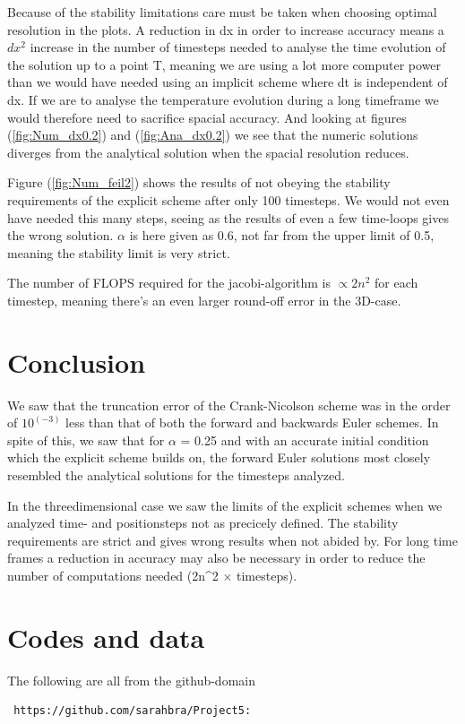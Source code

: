 \documentclass[a4paper,10pt]{article}
\begin{document}
Because of the stability limitations care must be taken when choosing optimal resolution in the plots. A reduction in dx in order to increase accuracy means a $dx^2$ increase in the number of timesteps needed to analyse the time evolution of the solution up to a point T, meaning we are using a lot more computer power than we would have needed using an implicit scheme where dt is independent of dx.
If we are to analyse the temperature evolution during a long timeframe we would therefore need to sacrifice spacial accuracy. And looking at figures (\ref{fig:Num_dx0.2}) and (\ref{fig:Ana_dx0.2}) we see that the numeric solutions diverges from the analytical solution when the spacial resolution reduces.

Figure (\ref{fig:Num_feil2}) shows the results of not obeying the stability requirements of the explicit scheme after only 100 timesteps. We would not even have needed this many steps, seeing as the results of even a few time-loops gives the wrong solution. $\alpha$ is here given as 0.6, not far from the upper limit of 0.5, meaning the stability limit is very strict.

The number of FLOPS required for the jacobi-algorithm is $\propto 2n^2$ for each timestep, meaning there's an even larger round-off error in the 3D-case.
\section{Conclusion}
We saw that the truncation error of the Crank-Nicolson scheme was in the order of $10^{(-3)}$ less than that of both the forward and backwards Euler schemes. In spite of this, we saw that for $\alpha$ = 0.25 and with an accurate initial condition which the explicit scheme builds on,
the forward Euler solutions most closely resembled the analytical solutions for the timesteps analyzed.

In the threedimensional case we saw the limits of the explicit schemes when we analyzed time- and positionsteps not as precicely defined. The stability requirements are strict and gives wrong results when not abided by.
For long time frames a reduction in accuracy may also be necessary in order to reduce the number of computations needed (2n^2 $\times$ timesteps).

\section{Codes and data}
The following are all from the github-domain 
\begin{verbatim}
 https://github.com/sarahbra/Project5:
\end{verbatim}\\
\end{document}
